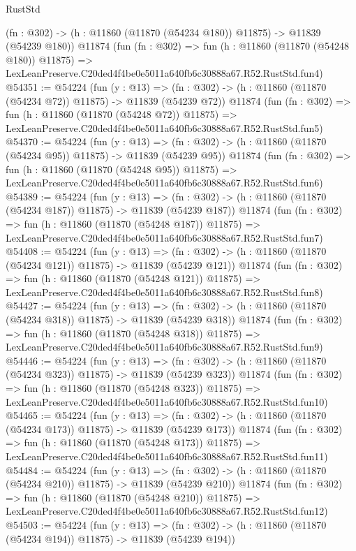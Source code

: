\begin{lexlean}{RustStd}
\begin{coremodule}
    (fn : @302) -> (h : @11860 (@11870 (@54234 @180)) @11875) -> @11839 (@54239 @180))
    @11874
    (fun (fn : @302) =>
    fun (h : @11860 (@11870 (@54248 @180)) @11875) =>
    LexLeanPreserve.C20ded4f4be0e5011a640fb6c30888a67.R52.RustStd.fun4)
@54351 := @54224
    (fun (y : @13) =>
    (fn : @302) -> (h : @11860 (@11870 (@54234 @72)) @11875) -> @11839 (@54239 @72))
    @11874
    (fun (fn : @302) =>
    fun (h : @11860 (@11870 (@54248 @72)) @11875) =>
    LexLeanPreserve.C20ded4f4be0e5011a640fb6c30888a67.R52.RustStd.fun5)
@54370 := @54224
    (fun (y : @13) =>
    (fn : @302) -> (h : @11860 (@11870 (@54234 @95)) @11875) -> @11839 (@54239 @95))
    @11874
    (fun (fn : @302) =>
    fun (h : @11860 (@11870 (@54248 @95)) @11875) =>
    LexLeanPreserve.C20ded4f4be0e5011a640fb6c30888a67.R52.RustStd.fun6)
@54389 := @54224
    (fun (y : @13) =>
    (fn : @302) -> (h : @11860 (@11870 (@54234 @187)) @11875) -> @11839 (@54239 @187))
    @11874
    (fun (fn : @302) =>
    fun (h : @11860 (@11870 (@54248 @187)) @11875) =>
    LexLeanPreserve.C20ded4f4be0e5011a640fb6c30888a67.R52.RustStd.fun7)
@54408 := @54224
    (fun (y : @13) =>
    (fn : @302) -> (h : @11860 (@11870 (@54234 @121)) @11875) -> @11839 (@54239 @121))
    @11874
    (fun (fn : @302) =>
    fun (h : @11860 (@11870 (@54248 @121)) @11875) =>
    LexLeanPreserve.C20ded4f4be0e5011a640fb6c30888a67.R52.RustStd.fun8)
@54427 := @54224
    (fun (y : @13) =>
    (fn : @302) -> (h : @11860 (@11870 (@54234 @318)) @11875) -> @11839 (@54239 @318))
    @11874
    (fun (fn : @302) =>
    fun (h : @11860 (@11870 (@54248 @318)) @11875) =>
    LexLeanPreserve.C20ded4f4be0e5011a640fb6c30888a67.R52.RustStd.fun9)
@54446 := @54224
    (fun (y : @13) =>
    (fn : @302) -> (h : @11860 (@11870 (@54234 @323)) @11875) -> @11839 (@54239 @323))
    @11874
    (fun (fn : @302) =>
    fun (h : @11860 (@11870 (@54248 @323)) @11875) =>
    LexLeanPreserve.C20ded4f4be0e5011a640fb6c30888a67.R52.RustStd.fun10)
@54465 := @54224
    (fun (y : @13) =>
    (fn : @302) -> (h : @11860 (@11870 (@54234 @173)) @11875) -> @11839 (@54239 @173))
    @11874
    (fun (fn : @302) =>
    fun (h : @11860 (@11870 (@54248 @173)) @11875) =>
    LexLeanPreserve.C20ded4f4be0e5011a640fb6c30888a67.R52.RustStd.fun11)
@54484 := @54224
    (fun (y : @13) =>
    (fn : @302) -> (h : @11860 (@11870 (@54234 @210)) @11875) -> @11839 (@54239 @210))
    @11874
    (fun (fn : @302) =>
    fun (h : @11860 (@11870 (@54248 @210)) @11875) =>
    LexLeanPreserve.C20ded4f4be0e5011a640fb6c30888a67.R52.RustStd.fun12)
@54503 := @54224
    (fun (y : @13) =>
    (fn : @302) -> (h : @11860 (@11870 (@54234 @194)) @11875) -> @11839 (@54239 @194))

\end{coremodule}
\end{lexlean}
